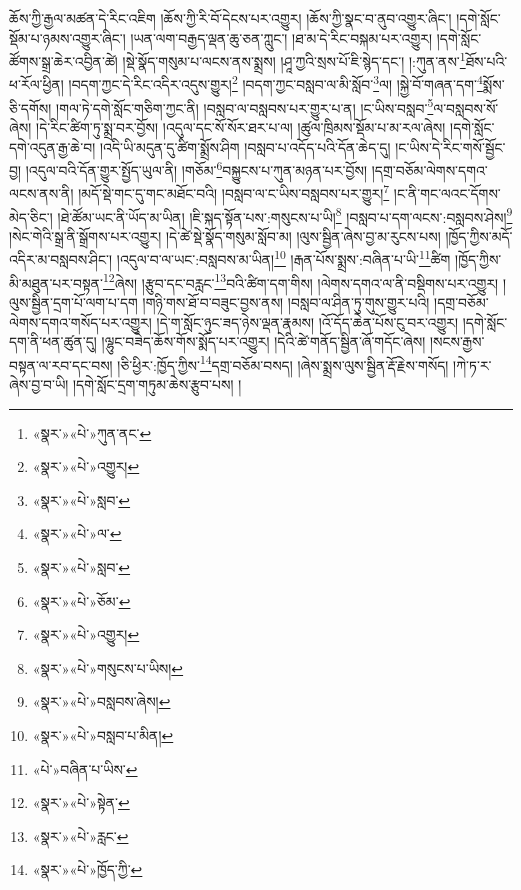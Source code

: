 ཆོས་ཀྱི་རྒྱལ་མཚན་དེ་རིང་འཇིག །ཆོས་ཀྱི་རི་བོ་དེངས་པར་འགྱུར། །ཆོས་ཀྱི་སྣང་བ་ནུབ་འགྱུར་ཞིང་། །དགེ་སློང་སྡོམ་པ་ཉམས་འགྱུར་ཞིང་། །ཡན་ལག་བརྒྱད་ལྡན་ཆུ་ཅན་ཀླུང་། །ཐ་མ་དེ་རིང་བསྐམ་པར་འགྱུར། །དགེ་སློང་ཚོགས་སྒྲ་ཆེར་འབྱིན་ཚེ། །སྡེ་སྣོད་གསུམ་པ་ལངས་ནས་སྨྲས། །ཤཱ་ཀྱའི་སྲས་པོ་ཇི་སྙེད་དང་། །:ཀུན་ནས་\footnote{«སྣར་»«པེ་»ཀུན་ནང་}ཐོས་པའི་ཕ་རོལ་ཕྱིན། །བདག་ཀྱང་དེ་རིང་འདིར་འདུས་གྱུར།\footnote{«སྣར་»«པེ་»འགྱུར།} །བདག་ཀྱང་བསླབ་ལ་མི་སློབ་\footnote{«སྣར་»«པེ་»སླབ་}ལ། །སྐྱེ་བོ་གཞན་དག་\footnote{«སྣར་»«པེ་»ལ་}སྨོས་ཅི་དགོས། །གལ་ཏེ་དགེ་སློང་གཅིག་ཀྱང་ནི། །བསླབ་ལ་བསླབས་པར་གྱུར་པ་ན། །ང་ཡིས་བསླབ་\footnote{«སྣར་»«པེ་»སླབ་}ལ་བསླབས་སོ་ཞེས། །དེ་རིང་ཚིག་ཏུ་སྨྲ་བར་བྱོས། །འདུལ་དང་སོ་སོར་ཐར་པ་ལ། །ཚུལ་ཁྲིམས་སྡོམ་པ་མ་རལ་ཞེས། །དགེ་སློང་དགེ་འདུན་རྒྱ་ཆེ་བ། །འདི་ཡི་མདུན་དུ་ཚིག་སྨྲོས་ཤིག །བསླབ་པ་འདོད་པའི་དོན་ཆེད་དུ། །ང་ཡིས་དེ་རིང་གསོ་སྦྱོང་བྱ། །འདུལ་བའི་དོན་གྱུར་སྤྱོད་ཡུལ་ནི། །གཅོམ་\footnote{«སྣར་»«པེ་»ཅོམ་}བསྐྱུངས་པ་ཀུན་མཉན་པར་བྱོས། །དགྲ་བཅོམ་ལེགས་དགའ་ལངས་ནས་ནི། །མདོ་སྡེ་གང་དུ་གང་མཐོང་བའི། །བསླབ་ལ་ང་ཡིས་བསླབས་པར་གྱུར།\footnote{«སྣར་»«པེ་»འགྱུར།} །ང་ནི་གང་ལའང་དོགས་མེད་ཅིང་། །ཐེ་ཚོམ་ཡང་ནི་ཡོད་མ་ཡིན། །ཇི་སྐད་སྟོན་པས་:གསུངས་པ་ཡི།\footnote{«སྣར་»«པེ་»གསུངས་པ་ཡིས།} །བསླབ་པ་དག་ལངས་:བསླབས་ཤེས།\footnote{«སྣར་»«པེ་»བསླབས་ཞེས།} །སེང་གེའི་སྒྲ་ནི་སྒྲོགས་པར་འགྱུར། །དེ་ཚེ་སྡེ་སྣོད་གསུམ་སློབ་མ། །ལུས་སྦྱིན་ཞེས་བྱ་མ་རུངས་པས། །ཁྱོད་ཀྱིས་མདོ་འདིར་མ་བསླབས་ཤིང་། །འདུལ་བ་ལ་ཡང་:བསླབས་མ་ཡིན།\footnote{«སྣར་»«པེ་»བསླབ་པ་མིན།} །རྒན་པོས་སྨྲས་:བཞིན་པ་ཡི་\footnote{«པེ་»བཞིན་པ་ཡིས་}ཚིག །ཁྱོད་ཀྱིས་མི་མཐུན་པར་བསྟན་\footnote{«སྣར་»«པེ་»སྟེན་}ཞེས། །རྩུབ་དང་བརླང་\footnote{«སྣར་»«པེ་»རླང་}བའི་ཚིག་དག་གིས། །ལེགས་དགའ་ལ་ནི་བསྡིགས་པར་འགྱུར། །ལུས་སྦྱིན་དྲག་པོ་ལག་པ་དག །གཉི་གས་ཐོ་བ་བཟུང་བྱས་ནས། །བསླབ་ལ་ཤིན་ཏུ་གུས་གྱུར་པའི། །དགྲ་བཅོམ་ལེགས་དགའ་གསོད་པར་འགྱུར། །དེ་ག་སློང་ཉུང་ཟད་ཉེས་ལྡན་རྣམས། །འོ་དོད་ཆེན་པོས་ངུ་བར་འགྱུར། །དགེ་སློང་དག་ནི་ཕན་ཚུན་དུ། །ལྷུང་བཟེད་ཆོས་གོས་སྨོད་པར་འགྱུར། །དེའི་ཚེ་གནོད་སྦྱིན་ཞོ་གདོང་ཞེས། །སངས་རྒྱས་བསྟན་ལ་རབ་དང་བས། །ཅི་ཕྱིར་:ཁྱོད་ཀྱིས་\footnote{«སྣར་»«པེ་»ཁྱོད་ཀྱི་}དགྲ་བཅོམ་བསད། །ཞེས་སྨྲས་ལུས་སྦྱིན་རྡོ་རྗེས་གསོད། །ཀེ་ཏ་ར་ཞེས་བྱ་བ་ཡི། །དགེ་སློང་དྲག་གཏུམ་ཆེས་རྩུབ་པས། །
